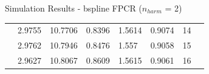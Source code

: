 \documentclass{beamer}
\begin{document}
\begin{frame}{Simulation Results - bspline FPCR ($n_{harm}$ = 2)}
\begin{table}
{\begin{tabular}{llllllll}
					& 2.9755                       & 10.7706                       & 0.8396                        & 1.5614                        & 0.9074           & 14               &  \\
					& 2.9762                       & 10.7946                       & 0.8476                        & 1.557                         & 0.9058           & 15               &  \\
					& 2.9627                       & 10.8067                       & 0.8609                        & 1.5615                        & 0.9061           & 16          
				\end{tabular}%
			}
		\end{table}
		\hyperlink{Results}{}
	\end{frame}
	
	
	
\end{document}

